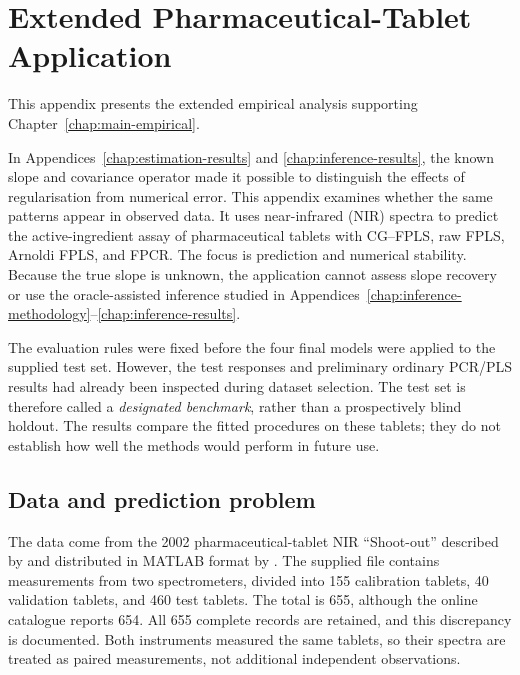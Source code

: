 \chapter{Extended Pharmaceutical-Tablet Application}
\label{chap:spectroscopy-application}

This appendix presents the extended empirical analysis supporting
Chapter~\ref{chap:main-empirical}.

In Appendices~\ref{chap:estimation-results} and \ref{chap:inference-results},
the known slope and covariance operator made it possible to distinguish the
effects of regularisation from numerical error.  This appendix examines
whether the same patterns appear in observed data.  It uses near-infrared
(NIR) spectra to predict the active-ingredient assay of pharmaceutical
tablets with CG--FPLS, raw FPLS, Arnoldi FPLS, and FPCR.  The focus is
prediction and numerical stability.  Because the true slope is unknown,
the application cannot assess slope recovery or use the oracle-assisted
inference studied in Appendices~\ref{chap:inference-methodology}--\ref{chap:inference-results}.

The evaluation rules were fixed before the four final models were applied
to the supplied test set.  However, the test responses and preliminary
ordinary PCR/PLS results had already been inspected during dataset
selection.  The test set is therefore called a \emph{designated benchmark},
rather than a prospectively blind holdout.  The results compare the fitted
procedures on these tablets; they do not establish how well the methods
would perform in future use.

\section{Data and prediction problem}
\label{sec:spectroscopy-data}

The data come from the 2002 pharmaceutical-tablet NIR ``Shoot-out'' described
by \textcite{hopkins_2003} and distributed in MATLAB format by
\textcite{eigenvector_tablets}.  The supplied file contains measurements
from two spectrometers, divided into 155 calibration tablets, 40 validation
tablets, and 460 test tablets.  The total is 655, although the online
catalogue reports 654.  All 655 complete records are retained, and this
discrepancy is documented.  Both instruments measured the same tablets, so
their spectra are treated as paired measurements, not additional independent
observations.


